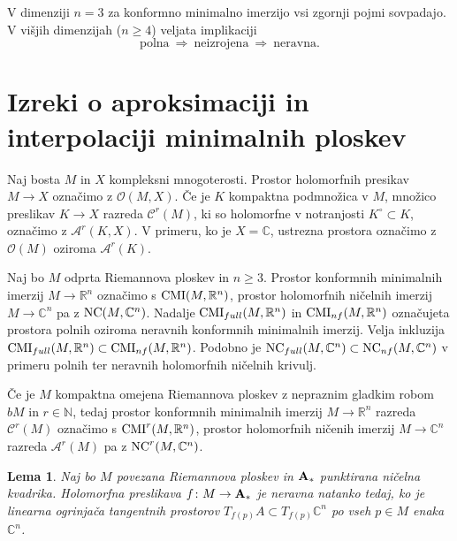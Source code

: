 \documentclass[12pt,a4paper,twoside]{article}
\theoremstyle{definition} %
\theoremstyle{plain} %
\newtheorem{lema}[definicija]{Lema}
\numberwithin{equation}{section}  %
\newcommand{\R}{\mathbb R}
\newcommand{\N}{\mathbb N}
\newcommand{\C}{\mathbb C}
\begin{document}
V dimenziji  $n=3$ za konformno minimalno imerzijo vsi zgornji pojmi sovpadajo. V višjih dimenzijah ($n \geq 4$) veljata implikaciji 
\[ \text{polna} \ \Rightarrow \ \text{neizrojena} \ \Rightarrow \ \text{neravna}. \]

%
\section{Izreki o aproksimaciji in interpolaciji minimalnih ploskev}

Naj bosta $M$ in $X$ kompleksni mnogoterosti. Prostor holomorfnih presikav $M \to X$ označimo z $\mathcal{O}(M,X)$.
Če je $K$ kompaktna podmnožica v $M$, množico preslikav $K \to X$ razreda $\mathcal{C}^{r}(M)$, ki so holomorfne v notranjosti $K^\circ \subset K$, označimo z $\mathcal{A}^{r}(K,X)$.
V primeru, ko je $X = \C$, ustrezna prostora označimo z $\mathcal{O}(M)$ oziroma $\mathcal{A}^{r}(K)$.

Naj bo $M$ odprta Riemannova ploskev in $n \geq 3$. Prostor konformnih minimalnih imerzij $M \to \R^{n}$ označimo s $\textup{CMI}(M, \R^{n})$, prostor holomorfnih ničelnih imerzij $M \to \C^{n}$ pa z $\textup{NC}(M, \C^{n})$.
Nadalje $\textup{CMI}_{full}(M, \R^{n})$ in $\textup{CMI}_{nf}(M, \R^{n})$ označujeta prostora polnih oziroma neravnih konformnih minimalnih imerzij. Velja inkluzija $\textup{CMI}_{full}(M, \R^{n}) \subset \textup{CMI}_{nf}(M, \R^{n})$.
Podobno je $\textup{NC}_{full}(M, \C^{n}) \subset \textup{NC}_{nf}(M, \C^{n})$ v primeru polnih ter neravnih holomorfnih ničelnih krivulj.

Če je $M$ kompaktna omejena Riemannova ploskev z nepraznim gladkim robom $bM$ in $r \in \N$, tedaj prostor konformnih minimalnih imerzij $M \to \R^{n}$ razreda $\mathcal{C}^{r}(M)$ označimo s $\textup{CMI}^{r}(M, \R^{n})$, prostor holomorfnih ničenih imerzij $M \to \C^{n}$ razreda $\mathcal{A}^{r}(M)$ pa z $\textup{NC}^{r}(M, \C^{n})$.

\begin{lema} \label{lema:neravna f}
Naj bo $M$ povezana Riemannova ploskev in $\textbf{\textup{A}}_{*}$ punktirana ničelna kvadrika.
Holomorfna preslikava $f \colon M \to \textbf{\textup{A}}_{*}$ je neravna natanko tedaj, ko je linearna ogrinjača tangentnih prostorov 
$T_{f(p)} A \subset T_{f(p)} \C^{n}$ po vseh $p \in M$ enaka $\C^{n}$.
\end{lema}
\end{document}
